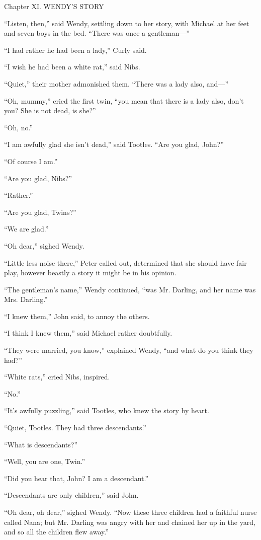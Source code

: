 Chapter XI.
WENDY'S STORY


``Listen, then,'' said Wendy, settling down to her story, with Michael at
her feet and seven boys in the bed. ``There was once a gentleman---''

``I had rather he had been a lady,'' Curly said.

``I wish he had been a white rat,'' said Nibs.

``Quiet,'' their mother admonished them. ``There was a lady also, and---''

``Oh, mummy,'' cried the first twin, ``you mean that there is a lady also,
don't you? She is not dead, is she?''

``Oh, no.''

``I am awfully glad she isn't dead,'' said Tootles. ``Are you glad, John?''

``Of course I am.''

``Are you glad, Nibs?''

``Rather.''

``Are you glad, Twins?''

``We are glad.''

``Oh dear,'' sighed Wendy.

``Little less noise there,'' Peter called out, determined that she should
have fair play, however beastly a story it might be in his opinion.

``The gentleman's name,'' Wendy continued, ``was Mr. Darling, and her name
was Mrs. Darling.''

``I knew them,'' John said, to annoy the others.

``I think I knew them,'' said Michael rather doubtfully.

``They were married, you know,'' explained Wendy, ``and what do you think
they had?''

``White rats,'' cried Nibs, inspired.

``No.''

``It's awfully puzzling,'' said Tootles, who knew the story by heart.

``Quiet, Tootles. They had three descendants.''

``What is descendants?''

``Well, you are one, Twin.''

``Did you hear that, John? I am a descendant.''

``Descendants are only children,'' said John.

``Oh dear, oh dear,'' sighed Wendy. ``Now these three children had a
faithful nurse called Nana; but Mr. Darling was angry with her and
chained her up in the yard, and so all the children flew away.''

